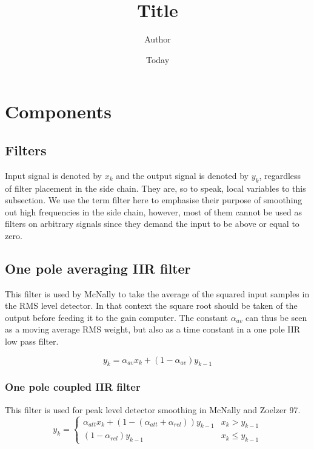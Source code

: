 \documentclass[]{article}
\begin{document}
\title{Title}
\author{Author}
\date{Today}
\maketitle

\section{Components}


\subsection{Filters}
Input signal is denoted by $x_k$ and the output signal is denoted by $y_k$, regardless of filter placement in the side chain. They are, so to speak, local variables to this subsection. We use the term filter here to emphasise their purpose of smoothing out high frequencies in the side chain, however, most of them cannot be used as filters on arbitrary signals since they demand the input to be above or equal to zero.

\subsection{One pole averaging IIR filter}
This filter is used by McNally to take the average of the squared input samples in the RMS level detector. In that context the square root should be taken of the output before feeding it to the gain computer. The constant $\alpha_{av}$ can thus be seen as a moving average RMS weight, but also as a time constant in a one pole IIR low pass filter.

\begin{equation}
y_k = \alpha_{av}x_k + (1-\alpha_{av}) y_{k-1}
\end{equation}

\subsubsection{One pole coupled IIR filter}
This filter is used for peak level detector smoothing in McNally and Zoelzer 97.
\begin{equation}
y_k = \begin{cases}
    \alpha_{att} x_k + (1- (\alpha_{att} + \alpha_{rel})) y_{k-1}  	& x_k > y_{k-1} \\
    (1-\alpha_{rel}) y_{k-1} 								& x_k \leq y_{k-1}
\end{cases}
\end{equation}
\end{document}
